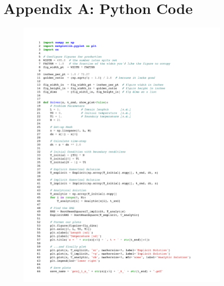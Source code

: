 \documentclass[twocolumn,10pt]{asme2ej}
\begin{document}
\section*{Appendix A: Python Code}

\begin{figure}[b]
\begin{center}
\includegraphics[page=1,width=0.93\textwidth]{../Karasinski - Case Study 1.pdf}
\end{center}
\end{figure}
\end{document}
